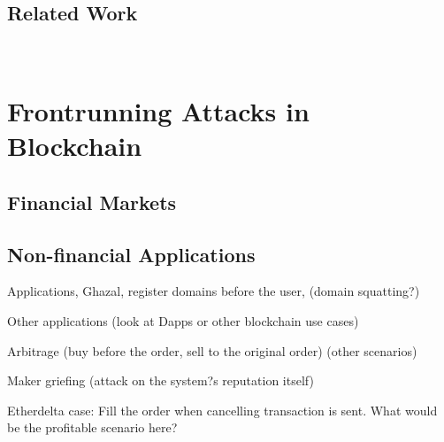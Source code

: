 \subsection{Related Work}

~\cite{malinova2017market}
~\cite{aune2017footprints}





















\section{Frontrunning Attacks in Blockchain}

\subsection{Financial Markets}




\subsection{Non-financial Applications}
Applications, Ghazal, register domains before the user, (domain squatting?) \par\noindent
Other applications (look at Dapps or other blockchain use cases)\par\noindent
Arbitrage (buy before the order, sell to the original order) (other scenarios)\par\noindent
Maker griefing (attack on the system?s reputation itself)\par\noindent
Etherdelta case: Fill the order when cancelling transaction is sent. What would be the profitable scenario here?

